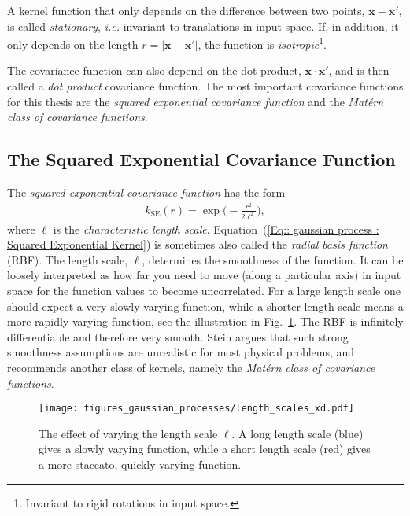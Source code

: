 \documentclass[twoside,english]{uiofysmaster}
\begin{document}
{{A kernel function that only depends on the difference between two points, $\textbf{x}-\textbf{x}'$, is called \textit{stationary}, \textit{i.e.} invariant to translations in input space. If, in addition, it only depends on the length $r=|\textbf{x}-\textbf{x}'|$, the function is \textit{isotropic}\footnote{Invariant to rigid rotations in input space.}.  

The covariance function can also depend on the dot product, $\textbf{x} \cdot \textbf{x}'$, and is then called a \textit{dot product} covariance function. The most important covariance functions for this thesis are the \textit{squared exponential covariance function} and the \textit{Mat\'{e}rn class of covariance functions}.




\subsection{The Squared Exponential Covariance Function}

The \textit{squared exponential covariance function} has the form 
\begin{align}\label{Eq:: gaussian process : Squared Exponential Kernel}
k_{\mathrm{SE}} (r) = \exp \Big( - \frac{r^2}{2 \ell^2} \Big),
\end{align} 
where $\ell$ is the \textit{characteristic length scale}. Equation~(\ref{Eq:: gaussian process : Squared Exponential Kernel}) is sometimes also called the \textit{radial basis function} (RBF). The length scale, $\ell$, determines the smoothness of the function. It can be loosely interpreted as how far you need to move (along a particular axis) in input space for the function values to become uncorrelated. For a large length scale one should expect a very slowly varying function, while a shorter length scale means a more rapidly varying function, see the illustration in Fig.~\ref{Fig:: gaussian process : ell variation example}. The RBF is infinitely differentiable and therefore very smooth. Stein \cite{stein2012interpolation} argues that such strong smoothness assumptions are unrealistic for most physical problems, and recommends another class of kernels, namely the \textit{Mat\'{e}rn class of covariance functions}.

\begin{figure}
\centering
\texttt{[image: figures\_gaussian\_processes/length\_scales\_xd.pdf]}
\caption{The effect of varying the length scale $\ell$. A long length scale (blue) gives a slowly varying function, while a short length scale (red) gives a more staccato, quickly varying function.}
\label{Fig:: gaussian process : ell variation example}
\end{figure}

}}
\end{document}
